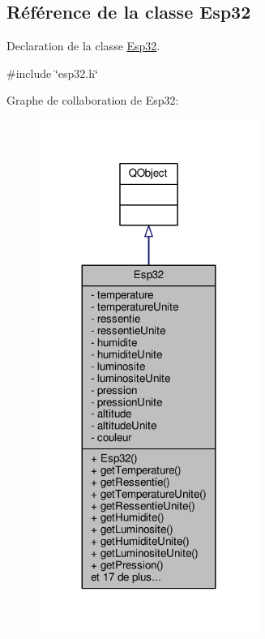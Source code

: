 \hypertarget{class_esp32}{}\subsection{Référence de la classe Esp32}
\label{class_esp32}


Declaration de la classe \hyperlink{class_esp32}{Esp32}.  




{\ttfamily \#include \char`\"{}esp32.\+h\char`\"{}}



Graphe de collaboration de Esp32\+:
\nopagebreak
\begin{figure}[H]
\begin{center}
\leavevmode
\includegraphics[width=203pt]{class_esp32__coll__graph}
\end{center}
\end{figure}

